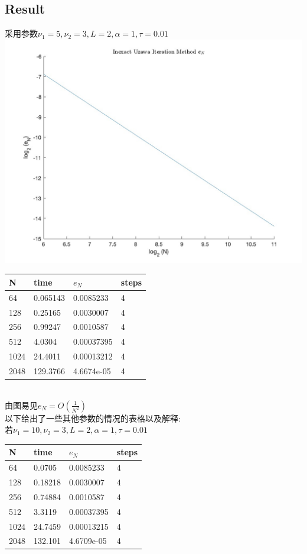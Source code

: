 \documentclass{article}
\begin{document}
\subsection{Result}
采用参数$\nu_1=5,\nu_2=3,L=2,\alpha=1,\tau=0.01$\\
\includegraphics[scale=0.3]{image/IUIM.jpg}\\
\begin{tabular}{llll}
N & time & $e_N$ & steps \\ 
\hline 
64 & 0.065143 & 0.0085233 & 4 \\ 
128 & 0.25165 & 0.0030007 & 4 \\ 
256 & 0.99247 & 0.0010587 & 4 \\ 
512 & 4.0304 & 0.00037395 & 4 \\ 
1024 & 24.4011 & 0.00013212 & 4 \\ 
2048 & 129.3766 & 4.6674e-05 & 4 \\ 
\hline 
\end{tabular}\\
由图易见$e_N=O(\frac{1}{N^2})$\\
以下给出了一些其他参数的情况的表格以及解释:\\
若$\nu_1=10,\nu_2=3,L=2,\alpha=1,\tau=0.01$\\
\begin{tabular}{llll}
N & time & $e_N$ & steps \\ 
\hline 
64 & 0.0705 & 0.0085233 & 4 \\ 
128 & 0.18218 & 0.0030007 & 4 \\ 
256 & 0.74884 & 0.0010587 & 4 \\ 
512 & 3.3119 & 0.00037395 & 4 \\ 
1024 & 24.7459 & 0.00013215 & 4 \\ 
2048 & 132.101 & 4.6709e-05 & 4 \\ 
\hline 
\end{tabular}\\
\end{document}
